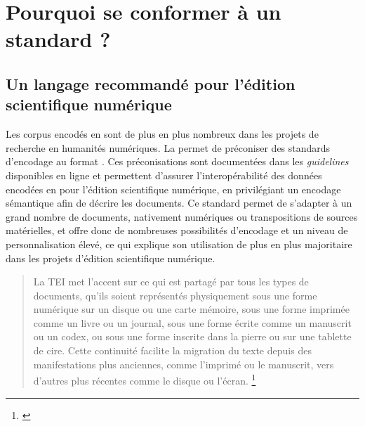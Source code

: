 \section{Pourquoi se conformer à un standard ? }
    \subsection{Un langage recommandé pour l’édition scientifique numérique}

Les corpus encodés en \TEI sont de plus en plus nombreux dans les projets de recherche en humanités numériques. La \TEI permet de préconiser des standards d'encodage au format \XML. Ces préconisations sont documentées dans les \textit{guidelines} disponibles en ligne et permettent d'assurer l'interopérabilité des données encodées en \XML pour l'édition scientifique numérique, en privilégiant un encodage sémantique afin de décrire les documents. Ce standard permet de s'adapter à un grand nombre de documents, nativement numériques ou transpositions de sources matérielles, et offre donc de nombreuses possibilités d'encodage et un niveau de personnalisation élevé, ce qui explique son utilisation de plus en plus majoritaire dans les projets d'édition scientifique numérique.

\begin{quote}
    La TEI met l’accent sur ce qui est partagé par tous les types de documents, qu’ils soient représentés physiquement sous une forme numérique sur un disque ou une carte mémoire, sous une forme imprimée comme un livre ou un journal, sous une forme écrite comme un manuscrit ou un codex, ou sous une forme inscrite dans la pierre ou sur une tablette de cire. Cette continuité facilite la migration du texte depuis des manifestations plus anciennes, comme l’imprimé ou le manuscrit, vers d’autres plus récentes comme le disque ou l’écran. \footnote{\cite{burnard_tei_2015}}
\end{quote}

